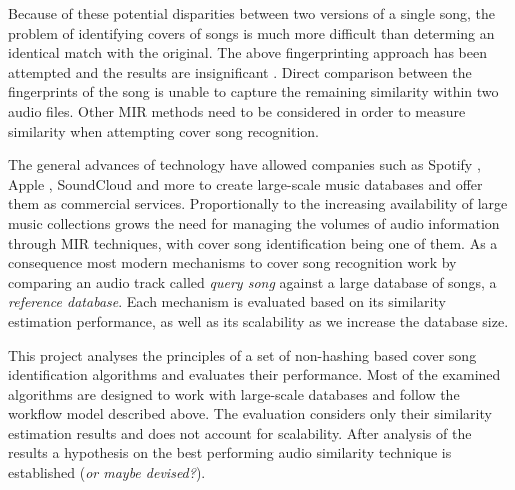 Because of these potential disparities between two versions of a single song,
the problem of identifying covers of songs is much more difficult than determing
an identical match with the original. The above fingerprinting approach
has been attempted \cite{bertin2011large} and the results are insignificant
\cite{ellis2012large}. Direct comparison between the fingerprints of the song is
unable to capture the remaining similarity within two audio files. Other MIR
methods need to be considered in order to measure similarity when attempting
cover song recognition.

The general advances of technology have allowed companies such as Spotify
\cite{spotify}, Apple \cite{applemusic}, SoundCloud \cite{soundcloud} and more
to create large-scale music databases and offer them as commercial services.
Proportionally to the increasing availability of large music collections grows
the need for managing the volumes of audio information through MIR techniques,
with cover song identification being one of them. As a consequence most modern
mechanisms to cover song recognition work by comparing an audio track called
\textit{query song} against a large database of songs, a \textit{reference
database}. Each mechanism is evaluated based on its similarity estimation
performance, as well as its scalability as we increase the database size.

This project analyses the principles of a set of non-hashing based cover song
identification algorithms and evaluates their performance. Most of the examined
algorithms are designed to work with large-scale databases and follow the
workflow model described above. The evaluation considers only their similarity
estimation results and does not account for scalability. After analysis of the
results a hypothesis on the best performing audio similarity technique is
established (\textit{or maybe devised?}).

